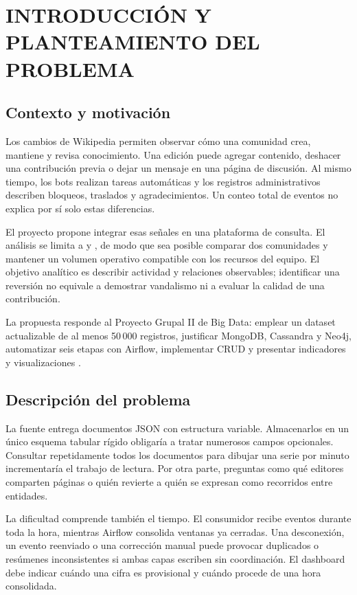 \chapter{INTRODUCCIÓN Y PLANTEAMIENTO DEL PROBLEMA}
\label{cap:intro}
\section{Contexto y motivación}
Los cambios de Wikipedia permiten observar cómo una comunidad crea, mantiene y revisa conocimiento. Una edición puede agregar contenido, deshacer una contribución previa o dejar un mensaje en una página de discusión. Al mismo tiempo, los bots realizan tareas automáticas y los registros administrativos describen bloqueos, traslados y agradecimientos. Un conteo total de eventos no explica por sí solo estas diferencias.

El proyecto propone integrar esas señales en una plataforma de consulta. El análisis se limita a  y , de modo que sea posible comparar dos comunidades y mantener un volumen operativo compatible con los recursos del equipo. El objetivo analítico es describir actividad y relaciones observables; identificar una reversión no equivale a demostrar vandalismo ni a evaluar la calidad de una contribución.

La propuesta responde al Proyecto Grupal II de Big Data: emplear un dataset actualizable de al menos 50\,000 registros, justificar MongoDB, Cassandra y Neo4j, automatizar seis etapas con Airflow, implementar CRUD y presentar indicadores y visualizaciones \cite{enunciado}.

\section{Descripción del problema}
La fuente entrega documentos JSON con estructura variable. Almacenarlos en un único esquema tabular rígido obligaría a tratar numerosos campos opcionales. Consultar repetidamente todos los documentos para dibujar una serie por minuto incrementaría el trabajo de lectura. Por otra parte, preguntas como qué editores comparten páginas o quién revierte a quién se expresan como recorridos entre entidades.

La dificultad comprende también el tiempo. El consumidor recibe eventos durante toda la hora, mientras Airflow consolida ventanas ya cerradas. Una desconexión, un evento reenviado o una corrección manual puede provocar duplicados o resúmenes inconsistentes si ambas capas escriben sin coordinación. El dashboard debe indicar cuándo una cifra es provisional y cuándo procede de una hora consolidada.


